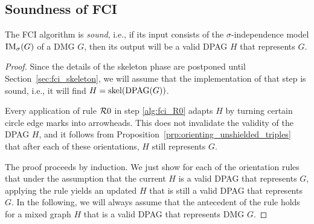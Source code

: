 \subsection{Soundness of FCI}

\begin{Thm}\label{thm:fci_sound}
  The FCI algorithm is \emph{sound}, i.e., if its input consists of the $\sigma$-independence model $\mathrm{IM}_\sigma(G)$ of a DMG $G$, then its output will be a valid DPAG $H$ that represents $G$.
\end{Thm}
\begin{proof}
  Since the details of the skeleton phase are postponed until Section~\ref{sec:fci_skeleton}, we will assume that the implementation of that step is sound, i.e., it will find $H = \mathrm{skel}(\mathrm{DPAG}(G))$.

  Every application of rule $\mathcal{R}0$ in step \ref{alg:fci_R0} adapts $H$ by turning certain circle edge marks into arrowheads.
  This does not invalidate the validity of the DPAG $H$, and it follows from Proposition~\ref{prp:orienting_unshielded_triples} that after each of these orientations, $H$ still represents $G$.

  The proof proceeds by induction.
  We just show for each of the orientation rules that under the assumption that the current $H$ is a valid DPAG that represents $G$, applying the rule yields an updated $H$ that is still a valid DPAG that represents $G$.
  In the following, we will always assume that the antecedent of the rule holds for a mixed graph $H$ that is a valid DPAG that represents DMG $G$.


\end{proof}

